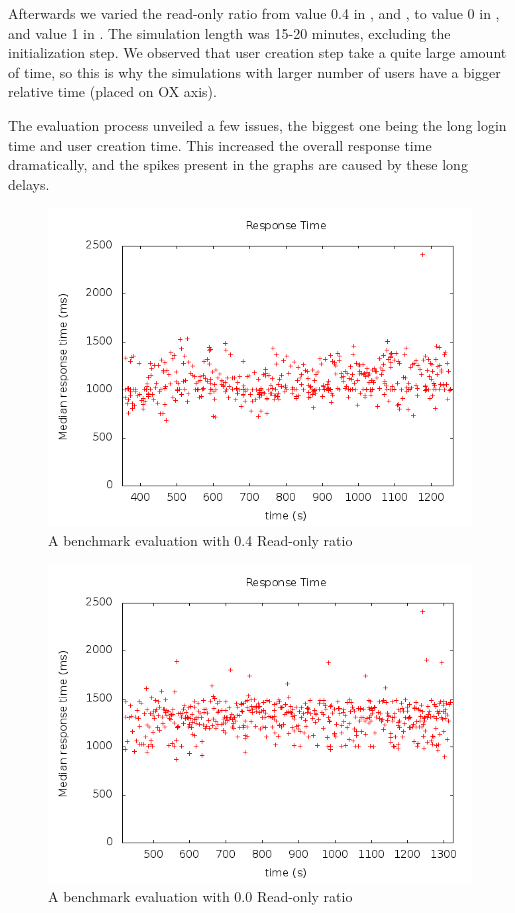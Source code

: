 Afterwards we varied the read-only ratio from value 0.4 in ,  and , to value 0  in , and value 1 in . The simulation length was 15-20 minutes, excluding the initialization step. We observed that user creation step take a quite large amount of time, so this is why the simulations with larger number of users have a bigger relative time (placed on OX axis).

The evaluation process unveiled a few issues, the biggest one being the long login time and user creation time. This increased the overall response time dramatically, and the spikes present in the graphs are caused by these long delays. 

\begin{figure}[ht]
  \centering %
  \includegraphics[scale=0.5]{src/img/out0.png}
  \caption{A benchmark evaluation with 0.4 Read-only ratio}
\label{figure:graph0}
\end{figure}

\begin{figure}[ht]
  \centering %
  \includegraphics[scale=0.5]{src/img/out1.png}
  \caption{A benchmark evaluation with 0.0 Read-only ratio}
\label{figure:graph1}
\end{figure}

